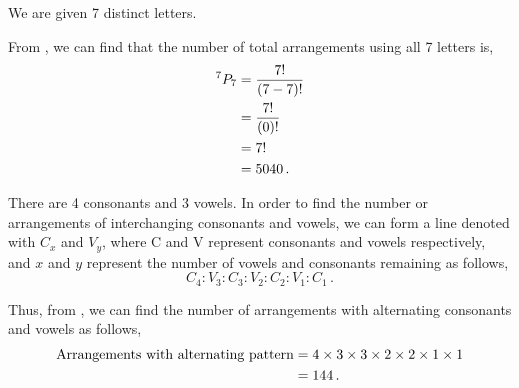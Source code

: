 %
%


\begin{subquestions}
	
\subquestion

We are given 7 distinct letters.

\begin{subsubquestions}

\subsubquestion

From , we can find that the number of total arrangements using all 7 letters is,
\begin{align}
	^7P_7 & = \frac{7!}{(7-7)!} \nonumber \\
	      & = \frac{7!}{(0)!} \nonumber \\
	      & = 7! \nonumber \\
	      & = 5040 \,.
\end{align}
	

\subsubquestion

There are 4 consonants and 3 vowels. In order to find the number or arrangements of interchanging consonants and vowels, we can form a line denoted with $C_x$ and $V_y$, where C and V represent consonants and vowels respectively, and $x$ and $y$ represent the number of vowels and consonants remaining as follows,
\begin{equation}
	C_4:V_3:C_3:V_2:C_2:V_1:C_1 \,.
\end{equation}

Thus, from , we can find the number of arrangements with alternating consonants and vowels as follows,
\begin{align}
	\text{Arrangements with alternating pattern} & = 4 \times 3\times 3\times 2\times 2\times 1\times 1 \nonumber \\
	                                             & = 144 \,.
\end{align}


\end{subsubquestions}
\end{subquestions}
